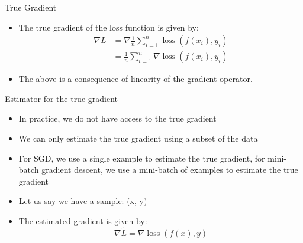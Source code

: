 \documentclass[usenames,dvipsnames]{beamer}
\begin{document}
    \begin{frame}{True Gradient}
        \begin{itemize}[<+->]
            \item The true gradient of the loss function is given by:
            $$
            \begin{aligned}
                \nabla L & =\nabla \frac{1}{n} \sum_{i=1}^n \operatorname{loss}\left(f\left(x_i\right), y_i\right) \\
                & =\frac{1}{n} \sum_{i=1}^n \nabla \operatorname{loss}\left(f\left(x_i\right), y_i\right)
                \end{aligned}
            $$
            \item The above is a consequence of linearity of the gradient operator.
        \end{itemize}
            
        
    \end{frame}

    \begin{frame}{Estimator for the true gradient}
        \begin{itemize}[<+->]
            \item In practice, we do not have access to the true gradient
            \item We can only estimate the true gradient using a subset of the data
            \item For SGD, we use a single example to estimate the true gradient, for mini-batch gradient descent, we use a mini-batch of examples to estimate the true gradient
            \item Let us say we have a sample: (x, y)
            \item The estimated gradient is given by:
            $$\nabla \tilde{L}=\nabla \operatorname{loss}(f(x), y)$$
        \end{itemize}
        
    \end{frame}
\end{document}
